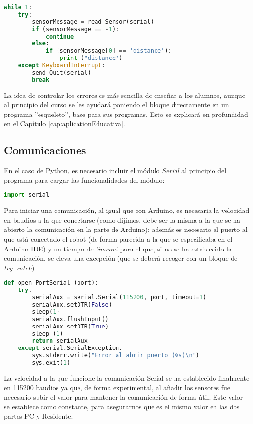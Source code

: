 \begin{lstlisting}[language=python,caption={Ejemplo de finalización de programa con control de errores}]
while 1:
	try:
		sensorMessage = read_Sensor(serial)    
		if (sensorMessage == -1):
			continue
		else:
			if (sensorMessage[0] == 'distance'):
				print ("distance")
	except KeyboardInterrupt:
		send_Quit(serial)
		break
\end{lstlisting}


La idea de controlar los errores es más sencilla de enseñar a los alumnos, aunque al principio del curso se les ayudará poniendo el bloque directamente en un programa ''esqueleto'', base para sus programas. Esto se explicará en profundidad en el Capítulo \ref{cap:aplicationEducativa}.


\subsection{Comunicaciones}\label{subsec:comunicacionesPython}

En el caso de Python, es necesario incluir el módulo \textit{Serial} al principio del programa para cargar las funcionalidades del módulo:
\begin{lstlisting}[language=python]
import serial
\end{lstlisting}

Para iniciar una comunicación, al igual que con Arduino, es necesaria la velocidad en baudios a la que conectarse (como dijimos, debe ser la misma a la que se ha abierto la comunicación en la parte de Arduino); además es necesario el puerto al que está conectado el robot (de forma parecida a la que se especificaba en el Arduino IDE) y un tiempo de \textit{timeout} para el que, si no se ha establecido la comunicación, se eleva una excepción (que se deberá recoger con un bloque de \textit{try..catch}). 
\begin{lstlisting}[language=python,caption={Función de la biblioteca Python para abrir el puerto serie}]	
def open_PortSerial (port):
	try:
		serialAux = serial.Serial(115200, port, timeout=1)
		serialAux.setDTR(False)
		sleep(1)
		serialAux.flushInput()
		serialAux.setDTR(True)
		sleep (1)
		return serialAux
	except serial.SerialException:
		sys.stderr.write("Error al abrir puerto (%s)\n")
		sys.exit(1)
\end{lstlisting}

La velocidad a la que funcione la comunicación Serial se ha establecido finalmente en 115200 baudios ya que, de forma experimental, al añadir los sensores fue necesario subir el valor para mantener la comunicación de forma útil. Este valor se establece como constante, para asegurarnos que es el mismo valor en las dos partes PC y Residente. 

